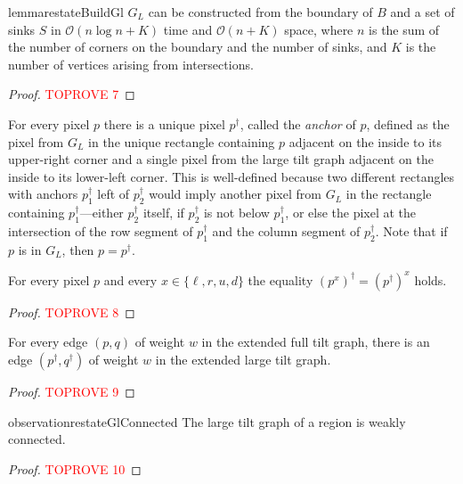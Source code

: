 \documentclass[a4paper,UKenglish,cleveref,thm-restate]{lipics-v2021}
\newcommand{\BigO}{\mathcal{O}}
\begin{document}
\begin{restatable}{lemma}{restateBuildGl}\label{lem:build-gl}
$G_L$ can be constructed from the boundary of $B$ and a set of sinks $S$ in
$\BigO(n \log n + K)$ time and $\BigO(n+K)$ space, where $n$ is the sum of the number
of corners on the boundary and the number of sinks, and $K$ is the
number of vertices arising from intersections.
\end{restatable}
\begin{proof}\textcolor{red}{TOPROVE 7}\end{proof}

For every pixel $p$ there is a unique pixel $p^\dagger$, called the
\emph{anchor} of $p$, defined as the pixel from $G_L$ in the unique rectangle
containing $p$ adjacent on the inside to its upper-right corner and a single
pixel from the large tilt graph adjacent on the inside to its lower-left corner.
This is well-defined because two different rectangles with anchors $p_1^\dagger$
left of $p_2^\dagger$ would imply another pixel from $G_L$ in the rectangle
containing $p_1^\dagger$---either $p_2^\dagger$ itself, if $p_2^\dagger$ is not
below $p_1^\dagger$, or else the pixel at the intersection of the row segment of
$p_1^\dagger$ and the column segment of $p_2^\dagger$. Note that if $p$ is
in $G_L$, then $p=p^\dagger$.

\begin{lemma}
    \label{lem:anchor-commutes}
    For every pixel $p$ and every $x \in \{\ell, r, u, d\}$ the equality
    \((p^x)^\dagger = (p^\dagger)^x\) holds.
\end{lemma}
\begin{proof}\textcolor{red}{TOPROVE 8}\end{proof}

\begin{lemma}
    \label{lem:anchor-edge}
    For every edge $(p,q)$ of weight $w$ in the extended full tilt graph, there is
    an edge $(p^\dagger,q^\dagger)$ of weight $w$ in the extended large tilt graph.
\end{lemma}
\begin{proof}\textcolor{red}{TOPROVE 9}\end{proof}

\begin{restatable}{observation}{restateGlConnected}\label{gl_connected}
The large tilt graph of a region is weakly connected.
\end{restatable}
\begin{proof}\textcolor{red}{TOPROVE 10}\end{proof}
\end{document}
